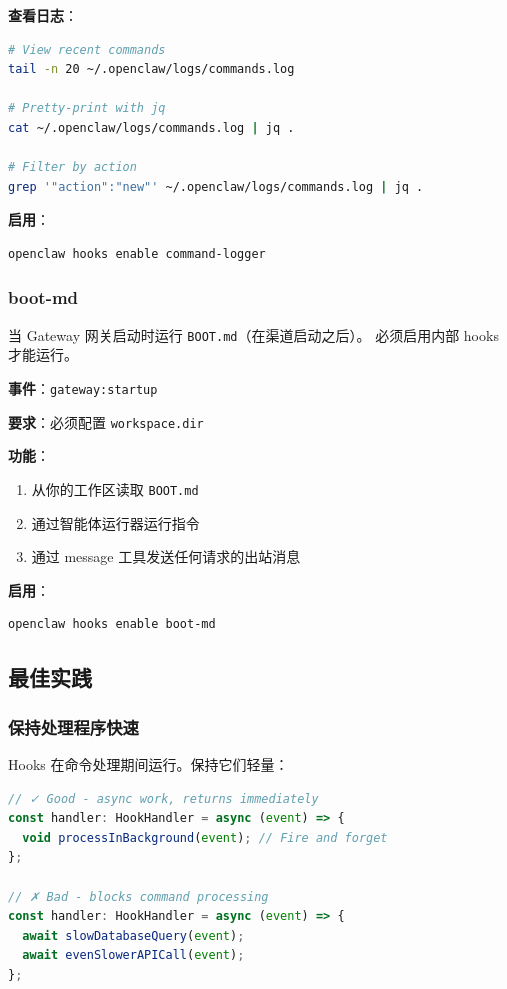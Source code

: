 \textbf{查看日志}：

\begin{lstlisting}[language=bash]
# View recent commands
tail -n 20 ~/.openclaw/logs/commands.log

# Pretty-print with jq
cat ~/.openclaw/logs/commands.log | jq .

# Filter by action
grep '"action":"new"' ~/.openclaw/logs/commands.log | jq .
\end{lstlisting}


\textbf{启用}：

\begin{lstlisting}[language=bash]
openclaw hooks enable command-logger
\end{lstlisting}


\subsubsection{boot-md}


当 Gateway 网关启动时运行 \texttt{BOOT.md}（在渠道启动之后）。
必须启用内部 hooks 才能运行。

\textbf{事件}：\texttt{gateway:startup}

\textbf{要求}：必须配置 \texttt{workspace.dir}

\textbf{功能}：

\begin{enumerate}
  \item 从你的工作区读取 \texttt{BOOT.md}
  \item 通过智能体运行器运行指令
  \item 通过 message 工具发送任何请求的出站消息
\end{enumerate}


\textbf{启用}：

\begin{lstlisting}[language=bash]
openclaw hooks enable boot-md
\end{lstlisting}


\subsection{最佳实践}


\subsubsection{保持处理程序快速}


Hooks 在命令处理期间运行。保持它们轻量：

\begin{lstlisting}[language=typescript]
// ✓ Good - async work, returns immediately
const handler: HookHandler = async (event) => {
  void processInBackground(event); // Fire and forget
};

// ✗ Bad - blocks command processing
const handler: HookHandler = async (event) => {
  await slowDatabaseQuery(event);
  await evenSlowerAPICall(event);
};
\end{lstlisting}


